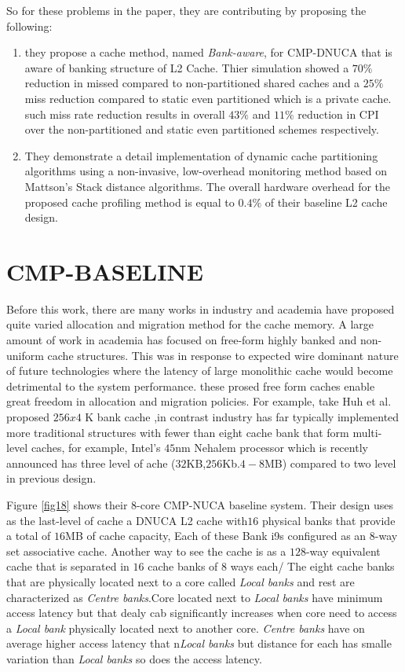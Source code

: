 \documentclass{report}
\begin{document}
So for these problems in the paper, they are contributing by proposing the following:

\begin{enumerate}
\item they propose a cache method, named \emph{Bank-aware}, for CMP-DNUCA that is aware of banking structure of L2 Cache. Thier simulation showed a $70\%$ reduction in missed compared to non-partitioned shared caches and a $25\%$ miss reduction compared to static even partitioned which is a private cache. such miss rate reduction results in overall $43\%$ and $11\%$ reduction in CPI over the non-partitioned and static even partitioned schemes respectively.

\item They demonstrate a detail implementation of dynamic cache partitioning algorithms using a non-invasive, low-overhead monitoring method based on Mattson's Stack distance algorithms. The overall hardware overhead for the proposed cache profiling method is equal to $0.4\%$ of their baseline L2 cache design.
\end{enumerate}

\section{ CMP-BASELINE }


Before this work, there are many works in industry and academia have proposed quite varied allocation and migration method for the cache memory. A large amount of work in academia has focused on free-form highly banked and non-uniform cache structures. This was in response to expected wire dominant nature of future technologies where the latency of large monolithic cache would become detrimental to the system performance.
these prosed free form caches enable great freedom in allocation and migration policies. For example, take Huh et al. proposed $256x4$ K bank cache ,in contrast industry has far typically implemented more traditional structures with fewer than eight cache bank that form multi-level  caches, for example, Intel's $45$nm Nehalem processor which is recently announced  has three level of ache ($32$KB,$256$Kb.$4-8$MB) compared to two level in previous design.\vspace{.8cm}

Figure \ref{fig18} shows their $8$-core CMP-NUCA baseline system. Their design uses as the last-level of cache a DNUCA L2 cache with$16$ physical banks that provide a total of $16$MB of cache capacity, Each of these Bank i9s configured as an $8$-way set associative cache. Another way to see the cache is as a $128$-way equivalent cache that is separated in $16$ cache banks of $8$ ways each/ The eight cache banks that are physically located next to a core called \emph{Local banks }and rest are characterized as \emph{Centre banks}.Core located next to \emph{Local banks} have minimum access latency but that dealy cab significantly increases when core need to access a \emph{Local bank} physically located next to another core. \emph{Centre banks} have on average higher access latency that n\emph{Local banks} but distance for each has smalle variation than \emph{ Local banks } so does the access latency.\vspace{.5cm}
\end{document}
